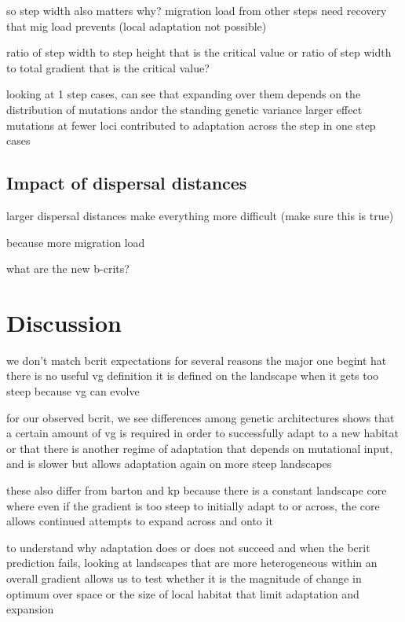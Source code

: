 	so step width also matters
		why?
		migration load from other steps
		need recovery that mig load prevents (local adaptation not possible)
		
		ratio of step width to step height that is the critical value
		or ratio of step width to total gradient that is the critical value?






	looking at 1 step cases, can see that expanding over them depends on the distribution of mutations and\/or the standing genetic variance
	larger effect mutations at fewer loci contributed to adaptation across the step in one step cases
	
\subsection{Impact of dispersal distances}

larger dispersal distances make everything more difficult (make sure this is true)

because more migration load

what are the new b-crits?


\section{Discussion}

we don't match bcrit expectations for several reasons
the major one begint hat there is no useful vg definition
it is defined on the landscape when it gets too steep
because vg can evolve

for our observed bcrit, we see differences among genetic architectures
shows that a certain amount of vg is required in order to successfully adapt to a new habitat
or that there is another regime of adaptation that depends on mutational input, and is slower but allows adaptation again on more steep landscapes

these also differ from barton and kp because there is a constant landscape core where even if the gradient is too steep to initially adapt to or across, the core allows continued attempts to expand across and onto it



to understand why adaptation does or does not succeed and when the bcrit prediction fails, looking at landscapes that are more heterogeneous within an overall gradient allows us to test whether it is the magnitude of change in optimum over space or the size of local habitat that limit adaptation and expansion




